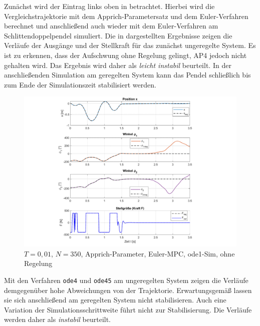 Zunächst wird der Eintrag links oben in  betrachtet. Hierbei wird die Vergleichstrajektorie mit dem Apprich-Parametersatz und dem Euler-Verfahren berechnet und anschließend auch wieder mit dem Euler-Verfahren am Schlittendoppelpendel simuliert. Die in  dargestellten Ergebnisse zeigen die Verläufe der Ausgänge und der Stellkraft für das zunächst ungeregelte System. Es ist zu erkennen, dass der Aufschwung ohne Regelung gelingt, AP4 jedoch nicht gehalten wird. Das Ergebnis wird daher als \textit{leicht instabil} beurteilt. In der anschließenden Simulation am geregelten System kann das Pendel schließlich bis zum Ende der Simulationszeit stabilisiert werden.

\begin{figure}
	\centering
		\includegraphics[scale=\scaleyplots]{Bilder/Trajektorien/F400T0.01_app_euler_ode1.pdf}
	\caption{$T=0,01$, $N=350$, Apprich-Parameter, Euler-MPC, ode1-Sim, ohne Regelung}
	\label{fig:F400T0.01_app_euler_ode1}
\end{figure}

Mit den Verfahren \texttt{ode4} und \texttt{ode45} am ungeregelten System zeigen die Verläufe demgegenüber hohe Abweichungen von der Trajektorie. Erwartungsgemäß lassen sie sich anschließend am geregelten System nicht stabilisieren. Auch eine Variation der Simulationsschrittweite führt nicht zur Stabilisierung. Die Verläufe werden daher als \textit{instabil} beurteilt. 

